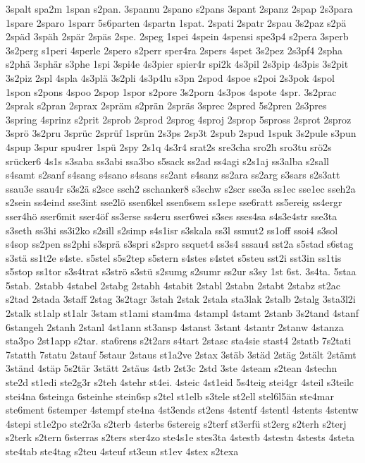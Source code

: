 {3spalt
spa2m
1span
s2pan.
3spannu
2spano
s2pans
3spant
2spanz
2spap
2s3para
1spare
2sparo
1sparr
5s6parten
4spartn
1spat.
2spati
2spatr
2spau
3s2paz
s2pä
2späd
3späh
2spär
2späs
2spe.
2speg
1spei
4spein
4spensi
spe3p4
s2pera
3sperb
3s2perg
s1peri
4sperle
2spero
s2perr
sper4ra
2spers
4spet
3s2pez
2s3pf4
2spha
s2phä
3sphär
s3phe
1spi
3spi4e
4s3pier
spier4r
spi2k
4s3pil
2s3pip
4s3pis
3s2pit
3s2piz
2spl
4spla
4s3plä
3s2pli
4s3p4lu
s3pn
2spod
4spoe
s2poi
2s3pok
4spol
1spon
s2pons
4spoo
2spop
1spor
s2pore
3s2porn
4s3pos
4spote
4spr.
3s2prac
2sprak
s2pran
2sprax
2spräm
s2prän
2spräs
3sprec
2spred
5s2pren
2s3pres
3spring
4sprinz
s2prit
2sprob
2sprod
2sprog
4sproj
2sprop
5spross
2sprot
2sproz
3sprö
3s2pru
3sprüc
2sprüf
1sprün
2s3ps
2sp3t
2spub
2spud
1spuk
3s2pule
s3pun
4spup
3spur
spu4rer
1spü
2spy
2s1q
4s3r4
srat2s
sre3cha
sro2h
sro3tu
srö2s
srücker6
4s1s
s3saba
ss3abi
ssa3bo
s5sack
ss2ad
ss4agi
s2s1aj
ss3alba
s2sall
s4samt
s2sanf
s4sang
s4sano
s4sans
ss2ant
s4sanz
ss2ara
ss2arg
s3sars
s2s3att
ssau3e
ssau4r
s3s2ä
s2sce
ssch2
sschanker8
s3schw
s2scr
sse3a
ss1ec
sse1ec
sseh2a
s2sein
ss4eind
sse3int
sse2lö
ssen6kel
ssen6sem
ss1epe
sse6ratt
ss5ereig
ss4ergr
sser4hö
sser6mit
sser4öf
ss3erse
ss4eru
sser6wei
s3ses
sses4sa
s4s3e4str
sse3ta
s3seth
ss3hi
ss3i2ko
s2sill
s2simp
s4s1isr
s3skala
ss3l
ssmut2
ss1off
ssoi4
s3sol
s4sop
ss2pen
ss2phi
s3sprä
s3spri
s2spro
ssquet4
ss3s4
sssau4
sst2a
s5stad
s6stag
s3stä
ss1t2e
s4ste.
s5stel
s5s2tep
s5stern
s4stes
s4stet
s5steu
sst2i
sst3in
ss1tis
s5stop
ss1tor
s3s4trat
s3strö
s3stü
s2sumg
s2sumr
ss2ur
s3sy
1st
6st.
3s4ta.
5staa
5stab.
2stabb
4stabel
2stabg
2stabh
4stabit
2stabl
2stabn
2stabt
2stabz
st2ac
s2tad
2stada
3staff
2stag
3s2tagr
3stah
2stak
2stala
sta3lak
2stalb
2stalg
3sta3l2i
2stalk
st1alp
st1alr
3stam
st1ami
stam4ma
4stampl
4stamt
2stanb
3s2tand
4stanf
6stangeh
2stanh
2stanl
4st1ann
st3ansp
4stanst
3stant
4stantr
2stanw
4stanza
sta3po
2st1app
s2tar.
sta6rens
s2t2ars
s4tart
2stasc
sta4sie
stast4
2statb
7s2tati
7statth
7statu
2stauf
5staur
2staus
st1a2ve
2stax
3stäb
3städ
2stäg
2stält
2stämt
3ständ
4stäp
5s2tär
3stätt
2stäus
4stb
2st3c
2std
3ste
4steam
s2tean
4stechn
ste2d
st1edi
ste2g3r
s2teh
4stehr
st4ei.
4steic
4st1eid
5s4teig
stei4gr
4steil
s3teilc
stei4na
6steinga
6steinhe
stein6sp
s2tel
st1elb
s3tele
st2ell
stel6l5än
ste4mar
ste6ment
6stemper
4stempf
ste4na
4st3ends
st2ens
4stentf
4stentl
4stents
4stentw
4stepi
st1e2po
ste2r3a
s2terb
4sterbs
6stereig
s2terf
st3erfü
st2erg
s2terh
s2terj
s2terk
s2tern
6sterras
s2ters
ster4zo
ste4s1e
stes3ta
4stestb
4stestn
4stests
4steta
ste4tab
ste4tag
s2teu
4steuf
st3eun
st1ev
4stex
s2texa
}
